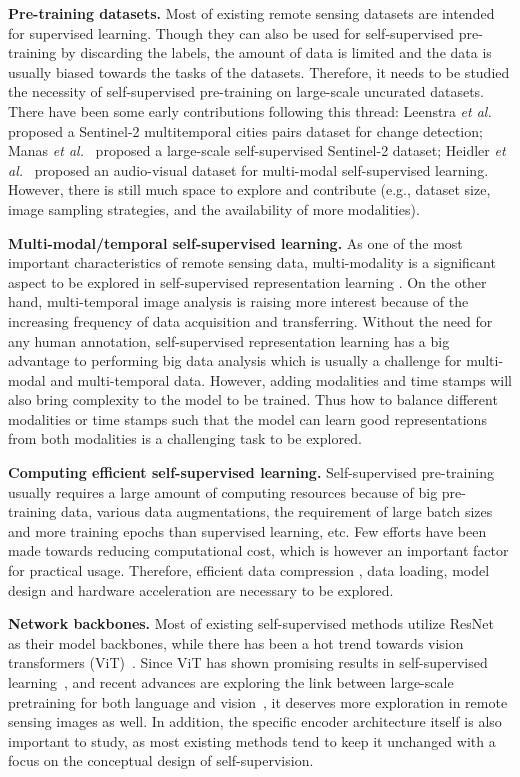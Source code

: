 \documentclass[lettersize,journal]{IEEEtran}
\newcommand{\etal}{\textit{et al.}}
\begin{document}
\textbf{Pre-training datasets.} Most of existing remote sensing datasets are intended for supervised learning. Though they can also be used for self-supervised pre-training by discarding the labels, the amount of data is limited and the data is usually biased towards the tasks of the datasets. Therefore, it needs to be studied the necessity of self-supervised pre-training on large-scale uncurated datasets. There have been some early contributions following this thread: Leenstra \etal~\cite{leenstra2021self} proposed a Sentinel-2 multitemporal cities pairs dataset for change detection; Manas \etal~\cite{manas2021seasonal} proposed a large-scale self-supervised Sentinel-2 dataset; Heidler \etal~\cite{heidler2021self} proposed an audio-visual dataset for multi-modal self-supervised learning. However, there is still much space to explore and contribute (e.g., dataset size, image sampling strategies, and the availability of more modalities). 

\textbf{Multi-modal/temporal self-supervised learning.} As one of the most important characteristics of remote sensing data, multi-modality is a significant aspect to be explored in self-supervised representation learning \cite{chen2021self0,wang2022self,dong2020self}. On the other hand, multi-temporal image analysis is raising more interest because of the increasing frequency of data acquisition and transferring. Without the need for any human annotation, self-supervised representation learning has a big advantage to performing big data analysis which is usually a challenge for multi-modal and multi-temporal data. However, adding modalities and time stamps will also bring complexity to the model to be trained. Thus how to balance different modalities or time stamps such that the model can learn good representations from both modalities is a challenging task to be explored. 

\color{blue}
\textbf{Computing efficient self-supervised learning.} Self-supervised pre-training usually requires a large amount of computing resources because of big pre-training data, various data augmentations, the requirement of large batch sizes and more training epochs than supervised learning, etc. Few efforts have been made towards reducing computational cost, which is however an important factor for practical usage. Therefore, efficient data compression \cite{cao2021rethinking}, data loading, model design \cite{he2021masked} and hardware acceleration are necessary to be explored.
\color{black}

\textbf{Network backbones.} Most of existing self-supervised methods utilize ResNet~\cite{he2016deep} as their model backbones, while there has been a hot trend towards vision transformers (ViT)~\cite{dosovitskiy2020image}. Since ViT has shown promising results in self-supervised learning~\cite{chen2021empirical,caron2021emerging,li2021efficient}, and recent advances are exploring the link between large-scale pretraining for both language and vision~\cite{he2021masked,zhou2021ibot}, it deserves more exploration in remote sensing images as well. In addition, the specific encoder architecture itself is also important to study, as most existing methods tend to keep it unchanged with a focus on the conceptual design of self-supervision.
\end{document}
